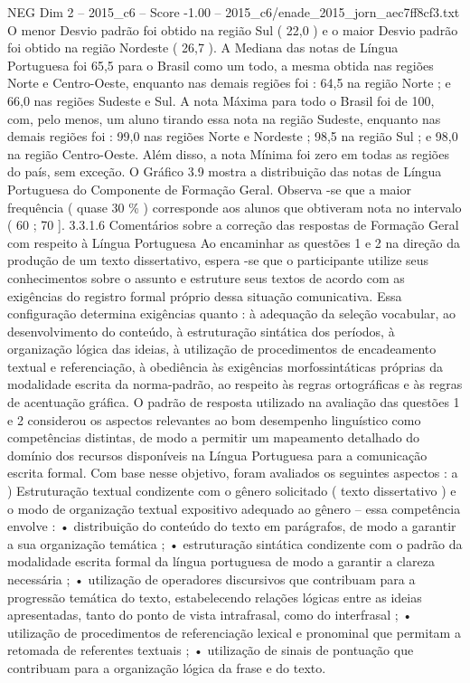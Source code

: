 \begin{textsample}{NEG Dim 2 – 2015\_c6 – Score -1.00 – 2015\_c6/enade\_2015\_jorn\_aec7ff8cf3.txt}
O menor Desvio padrão foi obtido na região Sul ( 22,0 ) e o maior Desvio padrão foi obtido na região Nordeste ( 26,7 ).
A Mediana das notas de Língua Portuguesa foi 65,5 para o Brasil como um todo, a mesma obtida nas regiões Norte e Centro-Oeste, enquanto nas demais regiões foi : 64,5 na região Norte ; e 66,0 nas regiões Sudeste e Sul.
A nota Máxima para todo o Brasil foi de 100, com, pelo menos, um aluno tirando essa nota na região Sudeste, enquanto nas demais regiões foi : 99,0 nas regiões Norte e Nordeste ; 98,5 na região Sul ; e 98,0 na região Centro-Oeste.
Além disso, a nota Mínima foi zero em todas as regiões do país, sem exceção.
O Gráfico 3.9 mostra a distribuição das notas de Língua Portuguesa do Componente de Formação Geral.
Observa -se que a maior frequência ( quase 30 \% ) corresponde aos alunos que obtiveram nota no intervalo ( 60 ; 70 ]. 3.3.1.6 Comentários sobre a correção das respostas de Formação Geral com respeito à Língua Portuguesa Ao encaminhar as questões 1 e 2 na direção da produção de um texto dissertativo, espera -se que o participante utilize seus conhecimentos sobre o assunto e estruture seus textos de acordo com as exigências do registro formal próprio dessa situação comunicativa.
Essa configuração determina exigências quanto : à adequação da seleção vocabular, ao desenvolvimento do conteúdo, à estruturação sintática dos períodos, à organização lógica das ideias, à utilização de procedimentos de encadeamento textual e referenciação, à obediência às exigências morfossintáticas próprias da modalidade escrita da norma-padrão, ao respeito às regras ortográficas e às regras de acentuação gráfica.
O padrão de resposta utilizado na avaliação das questões 1 e 2 considerou os aspectos relevantes ao bom desempenho linguístico como competências distintas, de modo a permitir um mapeamento detalhado do domínio dos recursos disponíveis na Língua Portuguesa para a comunicação escrita formal.
Com base nesse objetivo, foram avaliados os seguintes aspectos : a ) Estruturação textual condizente com o gênero solicitado ( texto dissertativo ) e o modo de organização textual expositivo adequado ao gênero – essa competência envolve : • distribuição do conteúdo do texto em parágrafos, de modo a garantir a sua organização temática ; • estruturação sintática condizente com o padrão da modalidade escrita formal da língua portuguesa de modo a garantir a clareza necessária ; • utilização de operadores discursivos que contribuam para a progressão temática do texto, estabelecendo relações lógicas entre as ideias apresentadas, tanto do ponto de vista intrafrasal, como do interfrasal ; • utilização de procedimentos de referenciação lexical e pronominal que permitam a retomada de referentes textuais ; • utilização de sinais de pontuação que contribuam para a organização lógica da frase e do texto.

\end{textsample}
